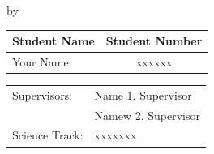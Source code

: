\begin{titlepage}
\setlength{\headheight}{14pt}
 \begin{center}

{\makeatletter
\largetitlestyle\fontsize{45}{45}\selectfont\@title
\makeatother}

{\makeatletter
\ifdefvoid{\@subtitle}{}{\bigskip\fontsize{20}{20}\selectfont\@subtitle}
\makeatother}

\bigskip
\bigskip

by

\bigskip
\bigskip

{\makeatletter
\largetitlestyle\fontsize{25}{25}\selectfont\@author
\makeatother}

\bigskip
\bigskip

\setlength\extrarowheight{2pt}
\begin{tabular}{lc}
    Student Name & Student Number \\\midrule
    Your Name & xxxxxx \\
\end{tabular}

\vfill

\begin{tabular}{ll}
    Supervisors: & Name 1. Supervisor \\
                 & Namew 2. Supervisor \\
    Science Track: & xxxxxxx
\end{tabular}

\bigskip
\bigskip



\end{center}

	
\end{titlepage}